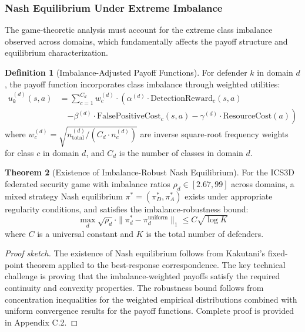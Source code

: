 \documentclass[12pt,a4paper]{article}
\theoremstyle{definition}
\newtheorem{theorem}{Theorem}[section]
\newtheorem{definition}[theorem]{Definition}
\begin{document}
\subsubsection{Nash Equilibrium Under Extreme Imbalance}

The game-theoretic analysis must account for the extreme class imbalance observed across domains, which fundamentally affects the payoff structure and equilibrium characterization.

\begin{definition}[Imbalance-Adjusted Payoff Functions]
\label{def:imbalance_payoffs}
For defender $k$ in domain $d$, the payoff function incorporates class imbalance through weighted utilities:
\begin{align}
u_k^{(d)}(s, a) &= \sum_{c=1}^{C_d} w_c^{(d)} \cdot \left(\alpha^{(d)} \cdot \text{DetectionReward}_c(s, a) \right. \nonumber\\
&\quad \left. - \beta^{(d)} \cdot \text{FalsePositiveCost}_c(s, a) - \gamma^{(d)} \cdot \text{ResourceCost}(a)\right)
\end{align}
where $w_c^{(d)} = \sqrt{n_{\text{total}}^{(d)}/(C_d \cdot n_c^{(d)})}$ are inverse square-root frequency weights for class $c$ in domain $d$, and $C_d$ is the number of classes in domain $d$.
\end{definition}

\begin{theorem}[Existence of Imbalance-Robust Nash Equilibrium]
\label{thm:nash_equilibrium}
For the ICS3D federated security game with imbalance ratios $\rho_d \in [2.67, 99]$ across domains, a mixed strategy Nash equilibrium $\pi^* = (\pi_D^*, \pi_A^*)$ exists under appropriate regularity conditions, and satisfies the imbalance-robustness bound:
\begin{equation}
\max_d \sqrt{\rho_d} \cdot \|\pi_d^* - \pi_d^{\text{uniform}}\|_1 \leq C \sqrt{\log K}
\end{equation}
where $C$ is a universal constant and $K$ is the total number of defenders.
\end{theorem}

\begin{proof}[Proof sketch]
The existence of Nash equilibrium follows from Kakutani's fixed-point theorem applied to the best-response correspondence. The key technical challenge is proving that the imbalance-weighted payoffs satisfy the required continuity and convexity properties. The robustness bound follows from concentration inequalities for the weighted empirical distributions combined with uniform convergence results for the payoff functions. Complete proof is provided in Appendix C.2.
\end{proof}
\end{document}

